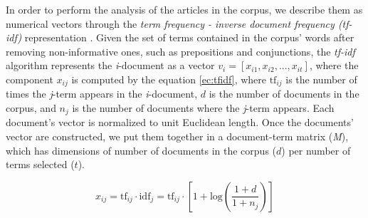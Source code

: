 \documentclass[a4paper, 12pt]{article}
\begin{document}
\par In order to perform the analysis of the articles in the corpus, we describe them as numerical vectors through the \textit{term frequency - inverse document frequency (tf-idf)} representation \cite{xu2003document}. Given the set of terms contained in the corpus' words after removing non-informative ones, such as prepositions and conjunctions, the \textit{tf-idf} algorithm represents the \textit{i}-document as a vector $v_i = [x_{i1}, x_{i2}, ... , x_{it}]$, where the component $x_{ij}$ is computed by the equation \ref{ec:tfidf}, where $\textrm{tf}_{ij}$ is the number of times the \textit{j}-term appears in the \textit{i}-document, $d$ is the number of documents in the corpus, and $n_j$ is the number of documents where the \textit{j}-term appears. Each document's vector is normalized to unit Euclidean length. Once the documents' vector are constructed, we put them together in a document-term matrix (\emph{M}), which has dimensions of number of documents in the corpus ($d$) per number of terms selected ($t$).

\begin{equation}
x_{ij} = \textrm{tf}_{ij} \cdot \textrm{idf}_{j} = \textrm{tf}_{ij} \cdot [1 + \textrm{log}(\frac{1 + d}{1 + n_j})] 
\label{ec:tfidf}
\end{equation}
\end{document}
